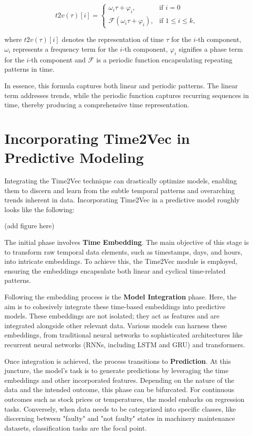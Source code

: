 \documentclass{tufte-handout}
\begin{document}
\[
t2v(\tau)[i] = 
\begin{cases} 
\omega_i \tau + \varphi_i, & \text{if } i = 0 \\
\mathcal{F}(\omega_i \tau + \varphi_i), & \text{if } 1 \leq i \leq k,
\end{cases}
\]

\noindent where \( t2v(\tau)[i] \) denotes the representation of time \( \tau \) for the \( i \)-th component, \( \omega_i \) represents a frequency term for the \( i \)-th component, \( \varphi_i \) signifies a phase term for the \( i \)-th component and \( \mathcal{F} \) is a periodic function encapsulating repeating patterns in time.

In essence, this formula captures both linear and periodic patterns. The linear term addresses trends, while the periodic function captures recurring sequences in time, thereby producing a comprehensive time representation.


\section{Incorporating Time2Vec in Predictive Modeling}

Integrating the Time2Vec technique can drastically optimize models, enabling them to discern and learn from the subtle temporal patterns and overarching trends inherent in data. Incorporating Time2Vec in a predictive model roughly looks like the following:

(add figure here)

The initial phase involves \textbf{Time Embedding}. The main objective of this stage is to transform raw temporal data elements, such as timestamps, days, and hours, into intricate embeddings. To achieve this, the Time2Vec module is employed, ensuring the embeddings encapsulate both linear and cyclical time-related patterns.

Following the embedding process is the \textbf{Model Integration} phase. Here, the aim is to cohesively integrate these time-based embeddings into predictive models. These embeddings are not isolated; they act as features and are integrated alongside other relevant data. Various models can harness these embeddings, from traditional neural networks to sophisticated architectures like recurrent neural networks (RNNs, including LSTM and GRU) and transformers.

Once integration is achieved, the process transitions to \textbf{Prediction}. At this juncture, the model's task is to generate predictions by leveraging the time embeddings and other incorporated features. Depending on the nature of the data and the intended outcome, this phase can be bifurcated. For continuous outcomes such as stock prices or temperatures, the model embarks on regression tasks. Conversely, when data needs to be categorized into specific classes, like discerning between "faulty" and "not faulty" states in machinery maintenance datasets, classification tasks are the focal point.
\end{document}
